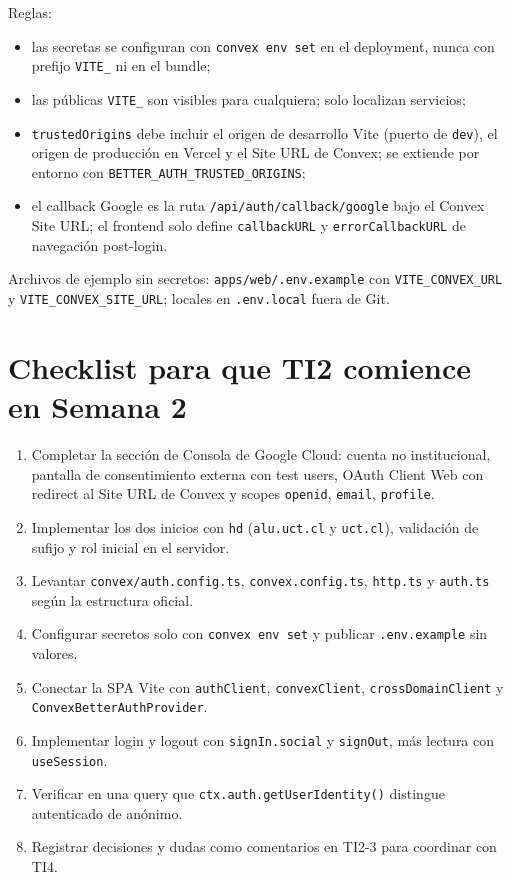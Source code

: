 \documentclass[11pt,a4paper]{article}
\begin{document}
Reglas:

\begin{itemize}
  \item las secretas se configuran con \texttt{convex env set} en el
    deployment, nunca con prefijo \texttt{VITE\_} ni en el bundle;
  \item las públicas \texttt{VITE\_} son visibles para cualquiera; solo
    localizan servicios;
  \item \texttt{trustedOrigins} debe incluir el origen de desarrollo Vite
    (puerto de \texttt{dev}), el origen de producción en Vercel y el Site URL
    de Convex; se extiende por entorno con
    \texttt{BETTER\_AUTH\_TRUSTED\_ORIGINS};
  \item el callback Google es la ruta \texttt{/api/auth/callback/google} bajo
    el Convex Site URL; el frontend solo define \texttt{callbackURL} y
    \texttt{errorCallbackURL} de navegación post-login.
\end{itemize}

Archivos de ejemplo sin secretos: \texttt{apps/web/.env.example} con
\texttt{VITE\_CONVEX\_URL} y \texttt{VITE\_CONVEX\_SITE\_URL}; locales en
\texttt{.env.local} fuera de Git.

\section{Checklist para que TI2 comience en Semana 2}

\begin{enumerate}
  \item Completar la sección de Consola de Google Cloud: cuenta no
    institucional, pantalla de consentimiento externa con test users, OAuth
    Client Web con redirect al Site URL de Convex y scopes \texttt{openid},
    \texttt{email}, \texttt{profile}.
  \item Implementar los dos inicios con \texttt{hd}
    (\texttt{alu.uct.cl} y \texttt{uct.cl}), validación de sufijo y rol
    inicial en el servidor.
  \item Levantar \texttt{convex/auth.config.ts}, \texttt{convex.config.ts},
    \texttt{http.ts} y \texttt{auth.ts} según la estructura oficial.
  \item Configurar secretos solo con \texttt{convex env set} y publicar
    \texttt{.env.example} sin valores.
  \item Conectar la SPA Vite con \texttt{authClient}, \texttt{convexClient},
    \texttt{crossDomainClient} y \texttt{ConvexBetterAuthProvider}.
  \item Implementar login y logout con \texttt{signIn.social} y
    \texttt{signOut}, más lectura con \texttt{useSession}.
  \item Verificar en una query que \texttt{ctx.auth.getUserIdentity()} distingue
    autenticado de anónimo.
  \item Registrar decisiones y dudas como comentarios en TI2-3 para coordinar
    con TI4.
\end{enumerate}
\end{document}
